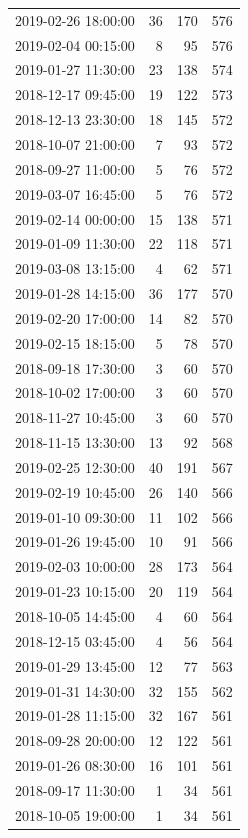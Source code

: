 \begin{tabular}{lrrr}
2019-02-26 18:00:00 & 36 & 170 & 576 \\
2019-02-04 00:15:00 & 8 & 95 & 576 \\
2019-01-27 11:30:00 & 23 & 138 & 574 \\
2018-12-17 09:45:00 & 19 & 122 & 573 \\
2018-12-13 23:30:00 & 18 & 145 & 572 \\
2018-10-07 21:00:00 & 7 & 93 & 572 \\
2018-09-27 11:00:00 & 5 & 76 & 572 \\
2019-03-07 16:45:00 & 5 & 76 & 572 \\
2019-02-14 00:00:00 & 15 & 138 & 571 \\
2019-01-09 11:30:00 & 22 & 118 & 571 \\
2019-03-08 13:15:00 & 4 & 62 & 571 \\
2019-01-28 14:15:00 & 36 & 177 & 570 \\
2019-02-20 17:00:00 & 14 & 82 & 570 \\
2019-02-15 18:15:00 & 5 & 78 & 570 \\
2018-09-18 17:30:00 & 3 & 60 & 570 \\
2018-10-02 17:00:00 & 3 & 60 & 570 \\
2018-11-27 10:45:00 & 3 & 60 & 570 \\
2018-11-15 13:30:00 & 13 & 92 & 568 \\
2019-02-25 12:30:00 & 40 & 191 & 567 \\
2019-02-19 10:45:00 & 26 & 140 & 566 \\
2019-01-10 09:30:00 & 11 & 102 & 566 \\
2019-01-26 19:45:00 & 10 & 91 & 566 \\
2019-02-03 10:00:00 & 28 & 173 & 564 \\
2019-01-23 10:15:00 & 20 & 119 & 564 \\
2018-10-05 14:45:00 & 4 & 60 & 564 \\
2018-12-15 03:45:00 & 4 & 56 & 564 \\
2019-01-29 13:45:00 & 12 & 77 & 563 \\
2019-01-31 14:30:00 & 32 & 155 & 562 \\
2019-01-28 11:15:00 & 32 & 167 & 561 \\
2018-09-28 20:00:00 & 12 & 122 & 561 \\
2019-01-26 08:30:00 & 16 & 101 & 561 \\
2018-09-17 11:30:00 & 1 & 34 & 561 \\
2018-10-05 19:00:00 & 1 & 34 & 561 \\

\end{tabular}
